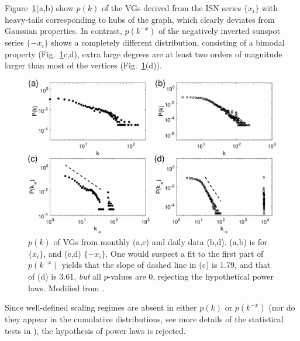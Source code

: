 		Figure~\ref{sn_sa_data}(a,b) show $p(k)$ of the VGs derived from the ISN series $\{x_i\}$ with heavy-tails corresponding to hubs of the graph, which clearly deviates from Gaussian properties. In contrast, $p(k^{-x})$ of the negatively inverted sunspot series $\{-x_i\}$ shows a completely different distribution, consisting of a bimodal property (Fig.~\ref{sn_sa_data}c,d), extra large degrees are at least two orders of magnitude larger than most of the vertices (Fig.~\ref{sn_sa_data}(d)).
		\begin{figure}
  		\centering
			\includegraphics[width=0.8\columnwidth]{Chapter06_Applications/pdf_degreeBelgimN.eps}
		\caption{$p(k)$ of VGs from monthly (a,c) and daily data (b,d). (a,b) is for $\{x_i\}$, and (c,d) $\{-x_i\}$. One would suspect a fit to the first part of $p(k^{-x})$ yields that the slope of dashed line in (c) is 1.79, and that of (d) is 3.61, {\emph{but}} all $p$-values are $0$, rejecting the hypothetical power laws. Modified from \cite{Zou2014a}. } \label{sn_sa_data}
		\end{figure}
		Since well-defined scaling regimes are absent in either $p(k)$ or $p(k^{-x})$ (nor do they appear in the cumulative distributions, see more details of the statistical tests in \cite{Zou2014a}), the hypothesis of power laws is rejected.

